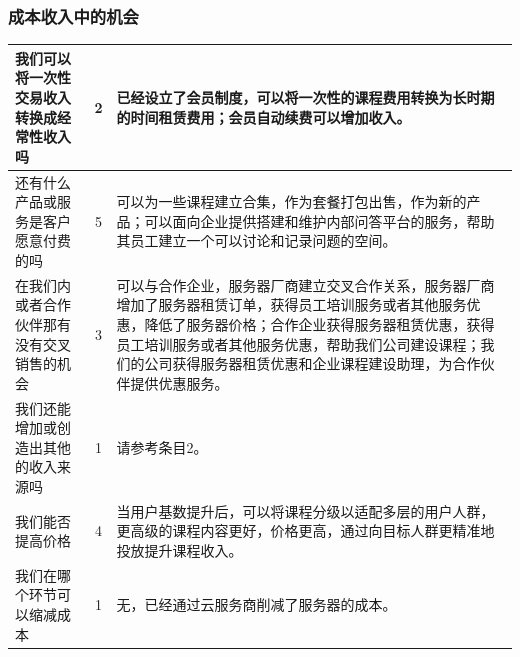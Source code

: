 \documentclass[a4paper]{ctexart}
\begin{document}

\FloatBarrier
\subsubsection{成本收入中的机会}
\begin{table}[h]
  \centering
\begin{tabular}{|p{3.5cm}|c|p{10cm}|}
  \hline
  我们可以将一次性交易收入转换成经常性收入吗 & 2 & 已经设立了会员制度，可以将一次性的课程费用转换为长时期的时间租赁费用；会员自动续费可以增加收入。\\
  \hline
  还有什么产品或服务是客户愿意付费的吗 & 5 & 可以为一些课程建立合集，作为套餐打包出售，作为新的产品；可以面向企业提供搭建和维护内部问答平台的服务，帮助其员工建立一个可以讨论和记录问题的空间。\\
  \hline
  在我们内或者合作伙伴那有没有交叉销售的机会 & 3 & 可以与合作企业，服务器厂商建立交叉合作关系，服务器厂商增加了服务器租赁订单，获得员工培训服务或者其他服务优惠，降低了服务器价格；合作企业获得服务器租赁优惠，获得员工培训服务或者其他服务优惠，帮助我们公司建设课程；我们的公司获得服务器租赁优惠和企业课程建设助理，为合作伙伴提供优惠服务。\\
  \hline
  我们还能增加或创造出其他的收入来源吗 & 1 & 请参考条目2。\\
  \hline
  我们能否提高价格 & 4 & 当用户基数提升后，可以将课程分级以适配多层的用户人群，更高级的课程内容更好，价格更高，通过向目标人群更精准地投放提升课程收入。\\
  \hline
  我们在哪个环节可以缩减成本 & 1 & 无，已经通过云服务商削减了服务器的成本。\\
  \hline
\end{tabular}
\end{table}



\end{document}
